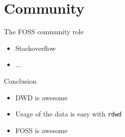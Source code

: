 \documentclass[compress, xcolor=dvipsnames]{beamer}\usepackage[]{graphicx}\usepackage[]{color}
\begin{document}

\section{Community}


\begin{frame}{The FOSS community role}
\pause
\begin{itemize}[<+->]
\item Stackoverflow
\item ...
\end{itemize}
\end{frame}


\begin{frame}{Conclusion}
\pause
\begin{itemize}[<+->]
\item DWD is awesome
\item Usage of the data is easy with \texttt{rdwd}
\item FOSS is awesome
\end{itemize}
\end{frame}

\end{document}
